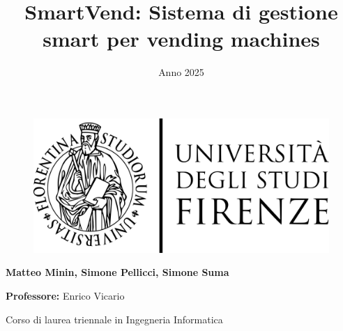 \title{SmartVend: Sistema di gestione smart per vending machines}
\author{}
\date{Anno 2025}


\begin{titlepage}
    \centering
    \begin{figure}
        \centering
        \includegraphics[width=1\linewidth]{assets/unifi_logo.png}
        \label{fig:unifi-logo}
    \end{figure}

    \maketitle

    \textbf{Matteo Minin, Simone Pellicci, Simone Suma}
    \vfill

    \textbf{Professore:}
    Enrico Vicario\\
    \vspace{10mm}
    
    Corso di laurea triennale in Ingegneria Informatica
\end{titlepage}

